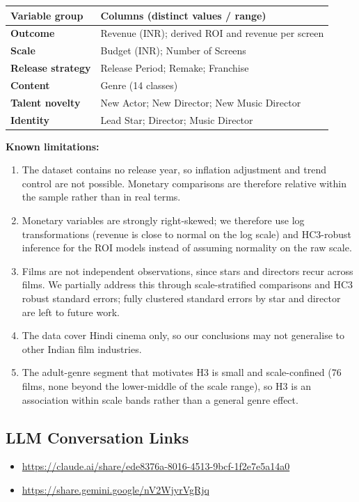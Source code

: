 \documentclass[11pt,a4paper]{article}
\begin{document}
\begin{center}\footnotesize
{}
\begin{tabularx}{\linewidth}{@{}>{\bfseries}p{3.0cm}X@{}}
\toprule
\rowcolor{white}\textbf{Variable group} & \textbf{Columns (distinct values / range)}\\
\midrule
Outcome & Revenue (INR); derived ROI and revenue per screen\\
Scale & Budget (INR); Number of Screens \\
Release strategy & Release Period; Remake; Franchise\\
Content & Genre (14 classes)\\
Talent novelty & New Actor; New Director; New Music Director\\
Identity & Lead Star;  Director; Music Director\\
\bottomrule
\end{tabularx}
\end{center}
\vspace{-6pt}
\newpage
\textbf{Known limitations:}
\begin{enumerate}[label=(\roman*)]
  \item The dataset contains no release year, so inflation adjustment and trend control are not possible. Monetary comparisons are therefore relative within the sample rather than in real terms.
  \item Monetary variables are strongly right-skewed; we therefore use log transformations (revenue is close to normal on the log scale) and HC3-robust inference for the ROI models instead of assuming normality on the raw scale.
  \item Films are not independent observations, since stars and directors recur across films. We partially address this through scale-stratified comparisons and HC3 robust standard errors; fully clustered standard errors by star and director are left to future work.
  \item The data cover Hindi cinema only, so our conclusions may not generalise to other Indian film industries.
  \item The adult-genre segment that motivates H3 is small and scale-confined (76 films, none beyond the lower-middle of the scale range), so H3 is an association within scale bands rather than a general genre effect.
\end{enumerate}

\subsection{LLM Conversation Links}
\begin{itemize}
  \item \url{https://claude.ai/share/ede8376a-8016-4513-9bcf-1f2e7e5a14a0}
  \item \url{https://share.gemini.google/nV2WjyrVgRjq}
\end{itemize}
\end{document}
